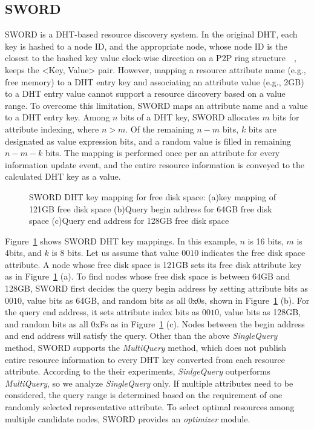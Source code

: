 \documentclass{acm_proc_article-sp}
\begin{document}
\subsection{SWORD}
SWORD is a DHT-based resource discovery system.
In the original DHT, each key is hashed to a node ID, and the appropriate node, whose node ID is the closest to the hashed key value clock-wise direction on a P2P ring structure~\cite{chord}~\cite{pastry}, keeps the <Key, Value> pair. 
However, mapping a resource attribute name (e.g., free memory) to a DHT entry key and associating an attribute value (e.g., 2GB) to a DHT entry value cannot support a resource discovery based on a value range. 
To overcome this limitation, SWORD maps an attribute name and a value to a DHT entry key. Among $n$ bits of a DHT key, SWORD allocates $m$ bits for attribute indexing, where $n>m$. 
Of the remaining $n-m$ bits, $k$ bits are designated as value expression bits, and a random value is filled in remaining $n-m-k$ bits.
The mapping is performed once per an attribute for every information update event, and the entire resource information is conveyed to the calculated DHT key as a value.
\begin{figure}
\centering
{}
\caption{\label{fig:sword}SWORD DHT key mapping for free disk space: (a)key mapping of 121GB free disk space (b)Query begin address for 64GB free disk space (c)Query end address for 128GB free disk space}
\end{figure}
Figure~\ref{fig:sword} shows SWORD DHT key mappings. In this example, $n$ is 16 bits, $m$ is 4bits, and $k$ is 8 bits. Let us assume that value $0010$ indicates the free disk space attribute.
A node whose free disk space is 121GB sets its free disk attribute key as in Figure~\ref{fig:sword} (a).
To find nodes whose free disk space is between 64GB and 128GB, SWORD first decides the query begin address by setting attribute bits as $0010$, value bits as 64GB, and random bits as all 0x0s, shown in Figure~\ref{fig:sword} (b).
For the query end address, it sets attribute index bits as $0010$, value bits as 128GB, and random bits as all 0xFs as in Figure~\ref{fig:sword} (c).
Nodes between the begin address and end address will satisfy the query. 
Other than the above \textit{SingleQuery} method, SWORD supports the \textit{MultiQuery} method, which does not publish entire resource information to every DHT key converted from each resource attribute.
According to the their experiments, \textit{SinlgeQuery} outperforms \textit{MultiQuery}, so we analyze \textit{SingleQuery} only.
If multiple attributes need to be considered, the query range is determined based on the requirement of one randomly selected representative attribute.
To select optimal resources among multiple candidate nodes, SWORD provides an \textit{optimizer} module.
\end{document}
